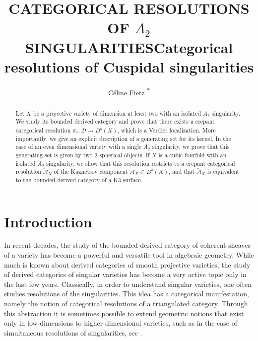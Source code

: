 \documentclass[a4paper, twoside, 11pt]{amsart}
\title{\MakeUppercase{Categorical resolutions of $A_2$ singularities}}
\title{Categorical resolutions of Cuspidal singularities}
\author[Céline Fietz]{Céline Fietz \textsuperscript{$\ast$}}
\theoremstyle{definition}
\theoremstyle{remark}
\numberwithin{equation}{theorem}
\newcommand{\dbx}{D^b(X)}
\begin{document}
\maketitle
\begin{abstract}
	Let $X$ be a projective variety of dimension at least two with an isolated $A_2$ singularity. We study its bounded derived category and prove that there exists a crepant categorical resolution $\pi_*\colon \widetilde{\mathcal{D}} \to \dbx$, which is a Verdier localization. More importantly, we give an explicit description of a generating set for its kernel. In the case of an even dimensional variety with a single $A_2$ singularity, we prove that this generating set is given by two $2$-spherical objects. If $X$ is a cubic fourfold with an isolated $A_2$ singularity, we show that this resolution restricts to a crepant categorical resolution $\widetilde{\mathcal{A}}_X$ of the Kuznetsov component $\mathcal{A}_X \subset \dbx$, and that $\widetilde{\mathcal{A}}_X$ is equivalent to the bounded derived category of a K3 surface. 
\end{abstract}

\setcounter{tocdepth}{1} 
\tableofcontents

\reversemarginpar
\section{Introduction}
In recent decades, the study of the bounded derived category of coherent sheaves of a variety has become a powerful and versatile tool in algebraic geometry. While much is known about derived categories of smooth projective varieties, the study of derived categories of singular varieties has become a very active topic only in the last few years. Classically, in order to understand singular varieties, one often studies resolutions of the singularities. This idea has a categorical manifestation, namely the notion of categorical resolutions of a triangulated category. Through this abstraction it is sometimes possible to extend geometric notions that exist only in low dimensions to higher dimensional varieties, such as in the case of simultaneous resolutions of singularities, see \cite{simulataneous}. 
\end{document}
